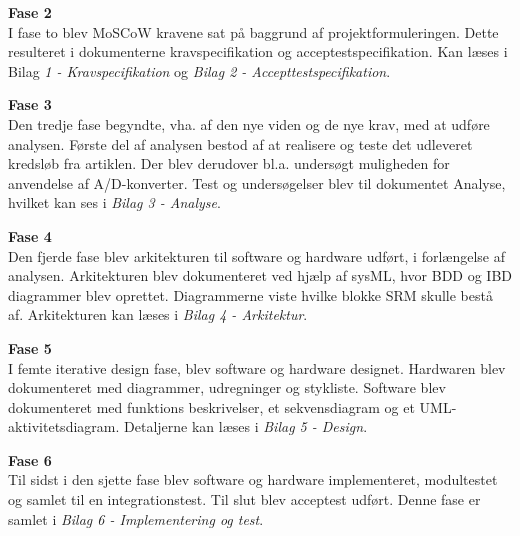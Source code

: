 \textbf{Fase 2}\\
I fase to blev MoSCoW kravene sat på baggrund af projektformuleringen. Dette resulteret i dokumenterne kravspecifikation og acceptestspecifikation. Kan læses i Bilag
\textit{1 - Kravspecifikation} og \textit{Bilag 2 - Accepttestspecifikation}.

\textbf{Fase 3}\\
Den tredje fase begyndte, vha. af den nye viden og de nye krav, med at udføre analysen. Første del af analysen bestod af at realisere og teste det udleveret kredsløb fra artiklen. Der blev derudover bl.a. undersøgt muligheden for anvendelse af A/D-konverter. Test og undersøgelser blev til dokumentet Analyse, hvilket kan ses i \textit{Bilag 3 - Analyse}.

\textbf{Fase 4}\\
Den fjerde fase blev arkitekturen til software og hardware udført, i forlængelse af analysen. Arkitekturen blev dokumenteret ved hjælp af sysML, hvor BDD og IBD diagrammer blev oprettet. Diagrammerne viste hvilke blokke SRM skulle bestå af. Arkitekturen kan læses i \textit{Bilag 4 - Arkitektur}.

\textbf{Fase 5}\\
I femte iterative design fase, blev software og hardware designet. Hardwaren blev dokumenteret med diagrammer, udregninger og stykliste. Software blev dokumenteret med funktions beskrivelser, et sekvensdiagram og et UML-aktivitetsdiagram. Detaljerne kan læses i \textit{Bilag 5 - Design}.

\textbf{Fase 6}\\
Til sidst i den sjette fase blev software og hardware implementeret, modultestet og samlet til en integrationstest. Til slut blev acceptest udført. Denne fase er samlet i \textit{Bilag 6 - Implementering og test}.





  

